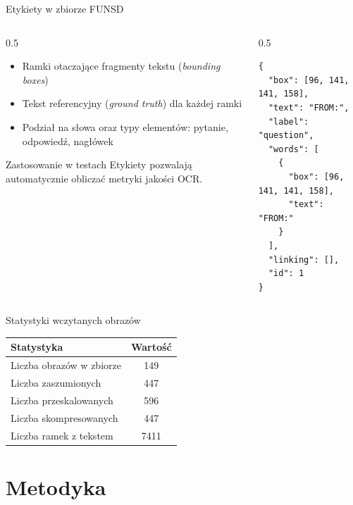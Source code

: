 \documentclass[aspectratio=169,11pt]{beamer}
\begin{document}
\begin{frame}[fragile]{Etykiety w zbiorze FUNSD}
  \begin{columns}[T]
    \begin{column}{0.5\textwidth}
      \begin{itemize}
        \item Ramki otaczające fragmenty tekstu (\emph{bounding boxes})
        \item Tekst referencyjny (\emph{ground truth}) dla każdej ramki
        \item Podział na słowa oraz typy elementów: pytanie, odpowiedź, nagłówek
      \end{itemize}
      \vspace{0.5em}
      \begin{alertblock}{Zastosowanie w testach}
        Etykiety pozwalają automatycznie obliczać metryki jakości OCR.
      \end{alertblock}
    \end{column}
    \begin{column}{0.5\textwidth}
\begin{lstlisting}
{
  "box": [96, 141, 141, 158],
  "text": "FROM:",
  "label": "question",
  "words": [
    {
      "box": [96, 141, 141, 158],
      "text": "FROM:"
    }
  ],
  "linking": [],
  "id": 1
}
\end{lstlisting}
    \end{column}
  \end{columns}
\end{frame}

\begin{frame}{Statystyki wczytanych obrazów}
  \begin{center}
    \begin{tabular}{lc}
      \toprule
      Statystyka & Wartość \\
      \midrule
      Liczba obrazów w zbiorze& 149\\
      Liczba zaszumionych & 447\\
      Liczba przeskalowanych & 596\\
      Liczba skompresowanych & 447\\
      Liczba ramek z tekstem & 7411\\
      \bottomrule
    \end{tabular}
  \end{center}
\end{frame}

\section{Metodyka}
\end{document}

